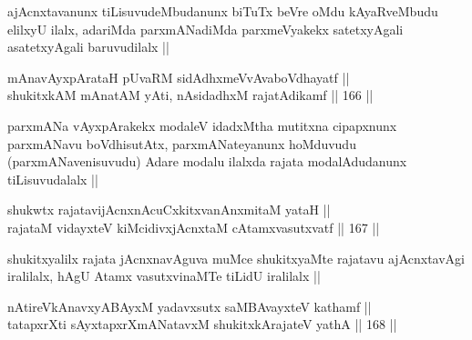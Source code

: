 \begin{artha}
ajAcnxtavanunx tiLisuvudeMbudanunx biTuTx beVre oMdu kAyaRveMbudu elilxyU ilalx, adariMda parxmANadiMda parxmeVyakekx satetxyAgali asatetxyAgali baruvudilalx ||
\end{artha}

\begin{shl}
mAnavAyxpArataH pUvaRM sidAdhxmeVvAvaboVdhayatf ||  \\
shukitxkAM mAnatAM yAti, nAsidadhxM rajatAdikamf ||  166 ||  
\end{shl}

\begin{artha}
parxmANa vAyxpArakekx modaleV idadxMtha mutitxna cipapxnunx parxmANavu boVdhisutAtx, parxmANateyanunx hoMduvudu (parxmANavenisuvudu) Adare modalu ilalxda rajata modalAdudanunx tiLisuvudalalx ||
\end{artha}


\begin{shl}
shukwtx rajatavijAcnxnAcuCxkitxvanAnxmitaM yataH || \\
rajataM vidayxteV kiMcidivxjAcnxtaM cA\s \s tamxvasutxvatf ||  167 ||  
\end{shl}

\begin{artha}
shukitxyalilx rajata jAcnxnavAguva muMce shukitxyaMte rajatavu ajAcnxtavAgi iralilalx, hAgU Atamx vasutxvinaMTe tiLidU iralilalx ||
\end{artha}

\begin{shl}
nAtireVkAnavxyABAyxM yadavxsutx saMBAvayxteV kathamf ||  \\
tatapxrXti sAyxtapxrXmANatavxM shukitxkArajateV yathA ||  168 ||  
\end{shl}

